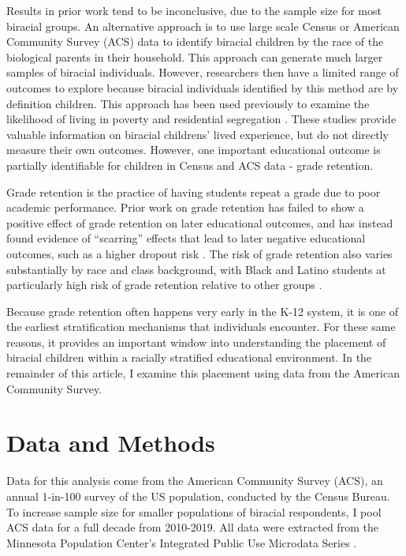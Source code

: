 \documentclass[
  12pt,
  letterpaper,
]{article}
\begin{document}
Results in prior work tend to be inconclusive, due to the sample size
for most biracial groups. An alternative approach is to use large scale
Census or American Community Survey (ACS) data to identify biracial
children by the race of the biological parents in their household. This
approach can generate much larger samples of biracial individuals.
However, researchers then have a limited range of outcomes to explore
because biracial individuals identified by this method are by definition
children. This approach has been used previously to examine the
likelihood of living in poverty
\autocite{bratter_multiracial_2013,bratter_poverty_2013} and residential
segregation \autocite{ellis_agents_2012}. These studies provide valuable
information on biracial childrens' lived experience, but do not directly
measure their own outcomes. However, one important educational outcome
is partially identifiable for children in Census and ACS data - grade
retention.

Grade retention is the practice of having students repeat a grade due to
poor academic performance. Prior work on grade retention has failed to
show a positive effect of grade retention on later educational outcomes,
and has instead found evidence of ``scarring'' effects that lead to
later negative educational outcomes, such as a higher dropout risk
\autocite{jimerson_metaanalysis_2001,stearns_staying_2007,andrew_scarring_2014,hughes_effect_2017}.
The risk of grade retention also varies substantially by race and class
background, with Black and Latino students at particularly high risk of
grade retention relative to other groups
\autocite{warren_patterns_2014}.

Because grade retention often happens very early in the K-12 system, it
is one of the earliest stratification mechanisms that individuals
encounter. For these same reasons, it provides an important window into
understanding the placement of biracial children within a racially
stratified educational environment. In the remainder of this article, I
examine this placement using data from the American Community Survey.

\hypertarget{data-and-methods}{%
\section{Data and Methods}\label{data-and-methods}}

Data for this analysis come from the American Community Survey (ACS), an
annual 1-in-100 survey of the US population, conducted by the Census
Bureau. To increase sample size for smaller populations of biracial
respondents, I pool ACS data for a full decade from 2010-2019. All data
were extracted from the Minnesota Population Center's Integrated Public
Use Microdata Series \autocite{ruggles_ipums_2020}.
\end{document}
